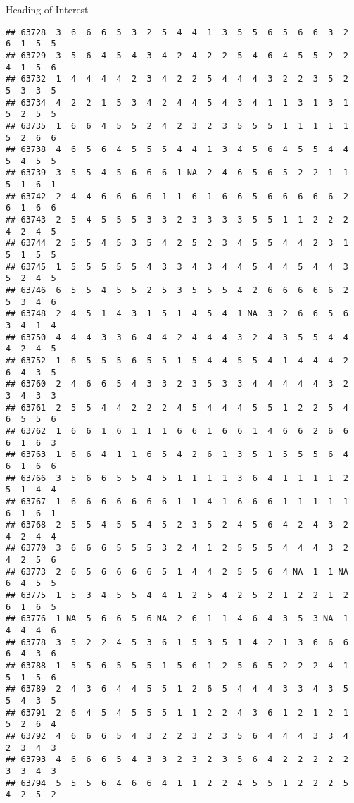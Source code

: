 \documentclass[
  ignorenonframetext,
]{beamer}
\begin{document}
\begin{frame}[fragile]{Heading of Interest}
\begin{verbatim}
## 63728  3  6  6  6  5  3  2  5  4  4  1  3  5  5  6  5  6  6  3  2  6  1  5  5
## 63729  3  5  6  4  5  4  3  4  2  4  2  2  5  4  6  4  5  5  2  2  4  1  5  6
## 63732  1  4  4  4  4  2  3  4  2  2  5  4  4  4  3  2  2  3  5  2  5  3  3  5
## 63734  4  2  2  1  5  3  4  2  4  4  5  4  3  4  1  1  3  1  3  1  5  2  5  5
## 63735  1  6  6  4  5  5  2  4  2  3  2  3  5  5  5  1  1  1  1  1  5  2  6  6
## 63738  4  6  5  6  4  5  5  5  4  4  1  3  4  5  6  4  5  5  4  4  5  4  5  5
## 63739  3  5  5  4  5  6  6  6  1 NA  2  4  6  5  6  5  2  2  1  1  5  1  6  1
## 63742  2  4  4  6  6  6  6  1  1  6  1  6  6  5  6  6  6  6  6  2  6  1  6  6
## 63743  2  5  4  5  5  5  3  3  2  3  3  3  3  5  5  1  1  2  2  2  4  2  4  5
## 63744  2  5  5  4  5  3  5  4  2  5  2  3  4  5  5  4  4  2  3  1  5  1  5  5
## 63745  1  5  5  5  5  5  4  3  3  4  3  4  4  5  4  4  5  4  4  3  5  2  4  5
## 63746  6  5  5  4  5  5  2  5  3  5  5  5  4  2  6  6  6  6  6  2  5  3  4  6
## 63748  2  4  5  1  4  3  1  5  1  4  5  4  1 NA  3  2  6  6  5  6  3  4  1  4
## 63750  4  4  4  3  3  6  4  4  2  4  4  4  3  2  4  3  5  5  4  4  4  2  4  5
## 63752  1  6  5  5  5  6  5  5  1  5  4  4  5  5  4  1  4  4  4  2  6  4  3  5
## 63760  2  4  6  6  5  4  3  3  2  3  5  3  3  4  4  4  4  4  3  2  3  4  3  3
## 63761  2  5  5  4  4  2  2  2  4  5  4  4  4  5  5  1  2  2  5  4  6  5  5  6
## 63762  1  6  6  1  6  1  1  1  6  6  1  6  6  1  4  6  6  2  6  6  6  1  6  3
## 63763  1  6  6  4  1  1  6  5  4  2  6  1  3  5  1  5  5  5  6  4  6  1  6  6
## 63766  3  5  6  6  5  5  4  5  1  1  1  1  3  6  4  1  1  1  1  2  5  1  4  4
## 63767  1  6  6  6  6  6  6  6  1  1  4  1  6  6  6  1  1  1  1  1  6  1  6  1
## 63768  2  5  5  4  5  5  4  5  2  3  5  2  4  5  6  4  2  4  3  2  4  2  4  4
## 63770  3  6  6  6  5  5  5  3  2  4  1  2  5  5  5  4  4  4  3  2  4  2  5  6
## 63773  2  6  5  6  6  6  6  5  1  4  4  2  5  5  6  4 NA  1  1 NA  6  4  5  5
## 63775  1  5  3  4  5  5  4  4  1  2  5  4  2  5  2  1  2  2  1  2  6  1  6  5
## 63776  1 NA  5  6  6  5  6 NA  2  6  1  1  4  6  4  3  5  3 NA  1  4  4  4  6
## 63778  3  5  2  2  4  5  3  6  1  5  3  5  1  4  2  1  3  6  6  6  6  4  3  6
## 63788  1  5  5  6  5  5  5  1  5  6  1  2  5  6  5  2  2  2  4  1  5  1  5  6
## 63789  2  4  3  6  4  4  5  5  1  2  6  5  4  4  4  3  3  4  3  5  5  4  3  5
## 63791  2  6  4  5  4  5  5  5  1  1  2  2  4  3  6  1  2  1  2  1  5  2  6  4
## 63792  4  6  6  6  5  4  3  2  2  3  2  3  5  6  4  4  4  3  3  4  2  3  4  3
## 63793  4  6  6  6  5  4  3  3  2  3  2  3  5  6  4  2  2  2  2  2  3  3  4  3
## 63794  5  5  5  6  4  6  6  4  1  1  2  2  4  5  5  1  2  2  2  5  4  2  5  2

\end{verbatim}
\end{frame}
\end{document}
